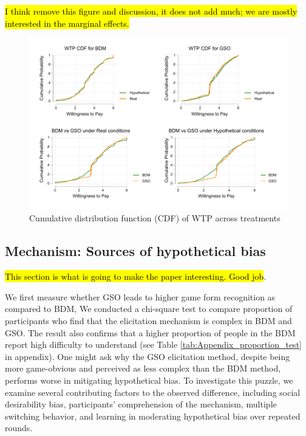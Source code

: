 \documentclass[12pt]{article}
\begin{document}
\hl{I think remove this figure and discussion, it does not add much; we are mostly interested in the marginal effects.}
\begin{figure}[H]
    \centering
    \includegraphics[width=0.8\linewidth]{After_infor_wtp_graph.pdf}
    \caption{Cumulative distribution function (CDF) of WTP across treatments}
    \label{fig:WTP_PDF_CDF_distribution}
\end{figure}



            
\subsection{Mechanism: Sources of hypothetical bias}
\hl{This section is what is going to make the paper interesting. Good job}.

 We first measure whether GSO leads to higher game form recognition as compared to BDM, We conducted a chi-square test to compare proportion of participants who find that the elicitation mechanism is complex in BDM and GSO. The result also confirms that a higher proportion of people in the BDM report high difficulty to understand (see Table \ref{tab:Appendix_proportion_test} in appendix). One might ask why the GSO elicitation method, despite being more game-obvious and perceived as less complex than the BDM method, performs worse in mitigating hypothetical bias. To investigate this puzzle, we examine several contributing factors to the observed difference, including social desirability bias, participants' comprehension of the mechanism, multiple switching behavior, and learning in moderating hypothetical bias over repeated rounds.
\end{document}
